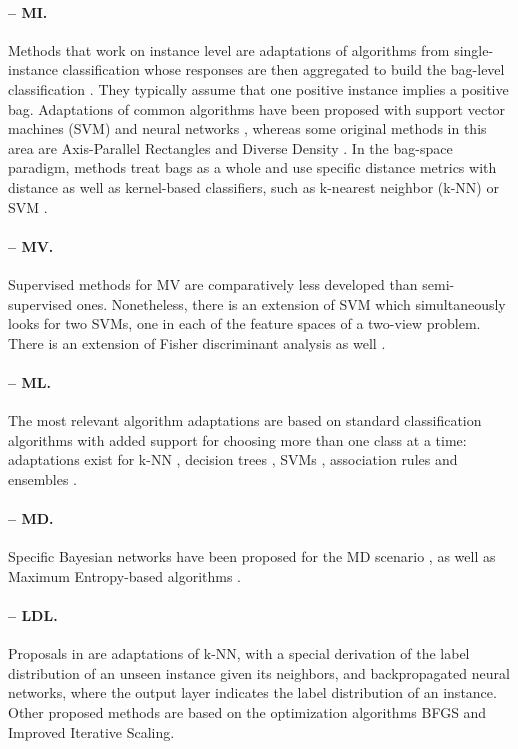 \documentclass[
	fontsize=11pt, %
	twoside=false, %
	open=any, %
	secnumdepth=1, %
]{kaobook}
\begin{document}
\paragraph{-- MI.} 
Methods that work on instance level are adaptations of algorithms from single-instance classification whose responses are then aggregated to build the bag-level classification \cite{mic-taxonomy}. They typically assume that one positive instance implies a positive bag. Adaptations of common algorithms have been proposed with support vector machines (SVM) \cite{mi-svm} and neural networks \cite{mi-nn}, whereas some original methods in this area are Axis-Parallel Rectangles \cite{mi-apr} and Diverse Density \cite{mi-framework}. In the bag-space paradigm, methods treat bags as a whole and use specific distance metrics with distance as well as kernel-based classifiers, such as k-nearest neighbor (k\nobreakdash-NN) \cite{mi-knn} or SVM \cite{mi-kernel}.

\paragraph{-- MV.} Supervised methods for MV are comparatively less developed than semi-supervised ones. Nonetheless, there is an extension of SVM \cite{mv-svm} which simultaneously looks for two SVMs, one in each of the feature spaces of a two-view problem. There is an extension of Fisher discriminant analysis as well \cite{mv-fda}.

\paragraph{-- ML.} The most relevant algorithm adaptations \cite{mlmethods} are based on standard classification algorithms with added support for choosing more than one class at a time: adaptations exist for k-NN \cite{ml-knn}, decision trees \cite{ml-dt}, SVMs \cite{ml-svm}, association rules \cite{ml-rules} and ensembles \cite{mlensembles}.

\paragraph{-- MD.} Specific Bayesian networks have been proposed for the MD scenario \cite{md-bayes,md-bayes2}, as well as Maximum Entropy-based algorithms \cite{mdc,mdc-indep}.

\paragraph{-- LDL.} Proposals in \cite{ldl} are adaptations of k-NN, with a special derivation of the label distribution of an unseen instance given its neighbors, and backpropagated neural networks, where the output layer indicates the label distribution of an instance. Other proposed methods are based on the optimization algorithms BFGS and Improved Iterative Scaling. 
\end{document}
